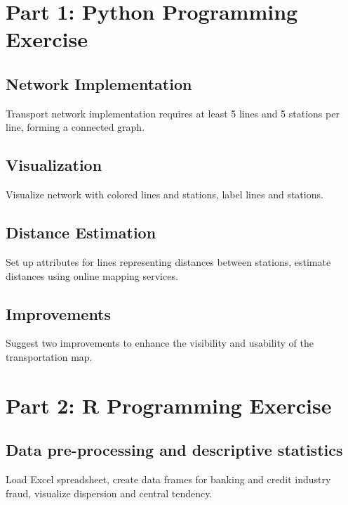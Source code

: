 \documentclass{article}
\begin{document}
\begin{cwauthorlist}
\end{cwauthorlist}

\section{Part 1: Python Programming Exercise}

\subsection{Network Implementation}

Transport network implementation requires at least 5 lines and 5 stations per line, forming a connected graph.

\subsection{Visualization}

Visualize network with colored lines and stations, label lines and stations.

\subsection{Distance Estimation}

Set up attributes for lines representing distances between stations, estimate distances using online mapping services.

\subsection{Improvements}

Suggest two improvements to enhance the visibility and usability of the transportation map.

\section{Part 2: R Programming Exercise}

\subsection{Data pre-processing and descriptive statistics}

Load Excel spreadsheet, create data frames for banking and credit industry fraud, visualize dispersion and central tendency.
\end{document}
